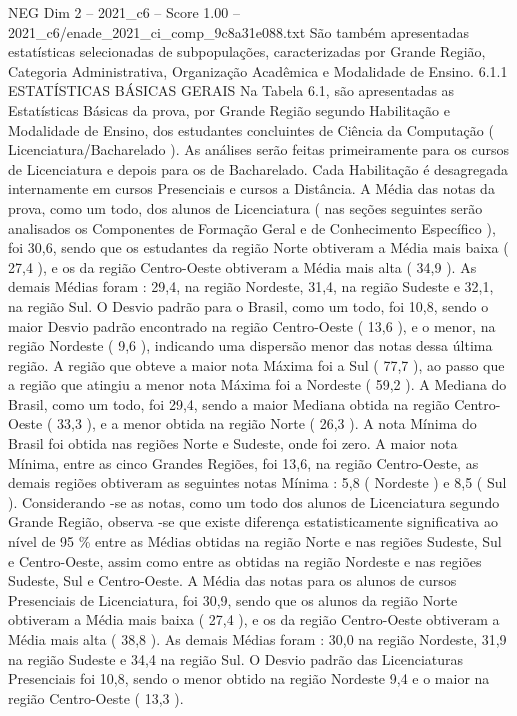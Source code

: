 \begin{textsample}{NEG Dim 2 – 2021\_c6 – Score 1.00 – 2021\_c6/enade\_2021\_ci\_comp\_9c8a31e088.txt}
São também apresentadas estatísticas selecionadas de subpopulações, caracterizadas por Grande Região, Categoria Administrativa, Organização Acadêmica e Modalidade de Ensino. 6.1.1 ESTATÍSTICAS BÁSICAS GERAIS Na Tabela 6.1, são apresentadas as Estatísticas Básicas da prova, por Grande Região segundo Habilitação e Modalidade de Ensino, dos estudantes concluintes de Ciência da Computação ( Licenciatura/Bacharelado ).
As análises serão feitas primeiramente para os cursos de Licenciatura e depois para os de Bacharelado.
Cada Habilitação é desagregada internamente em cursos Presenciais e cursos a Distância.
A Média das notas da prova, como um todo, dos alunos de Licenciatura ( nas seções seguintes serão analisados os Componentes de Formação Geral e de Conhecimento Específico ), foi 30,6, sendo que os estudantes da região Norte obtiveram a Média mais baixa ( 27,4 ), e os da região Centro-Oeste obtiveram a Média mais alta ( 34,9 ).
As demais Médias foram : 29,4, na região Nordeste, 31,4, na região Sudeste e 32,1, na região Sul.
O Desvio padrão para o Brasil, como um todo, foi 10,8, sendo o maior Desvio padrão encontrado na região Centro-Oeste ( 13,6 ), e o menor, na região Nordeste ( 9,6 ), indicando uma dispersão menor das notas dessa última região.
A região que obteve a maior nota Máxima foi a Sul ( 77,7 ), ao passo que a região que atingiu a menor nota Máxima foi a Nordeste ( 59,2 ).
A Mediana do Brasil, como um todo, foi 29,4, sendo a maior Mediana obtida na região Centro-Oeste ( 33,3 ), e a menor obtida na região Norte ( 26,3 ).
A nota Mínima do Brasil foi obtida nas regiões Norte e Sudeste, onde foi zero.
A maior nota Mínima, entre as cinco Grandes Regiões, foi 13,6, na região Centro-Oeste, as demais regiões obtiveram as seguintes notas Mínima : 5,8 ( Nordeste ) e 8,5 ( Sul ).
Considerando -se as notas, como um todo dos alunos de Licenciatura segundo Grande Região, observa -se que existe diferença estatisticamente significativa ao nível de 95 \% entre as Médias obtidas na região Norte e nas regiões Sudeste, Sul e Centro-Oeste, assim como entre as obtidas na região Nordeste e nas regiões Sudeste, Sul e Centro-Oeste.
A Média das notas para os alunos de cursos Presenciais de Licenciatura, foi 30,9, sendo que os alunos da região Norte obtiveram a Média mais baixa ( 27,4 ), e os da região Centro-Oeste obtiveram a Média mais alta ( 38,8 ).
As demais Médias foram : 30,0 na região Nordeste, 31,9 na região Sudeste e 34,4 na região Sul.
O Desvio padrão das Licenciaturas Presenciais foi 10,8, sendo o menor obtido na região Nordeste 9,4 e o maior na região Centro-Oeste ( 13,3 ).

\end{textsample}
